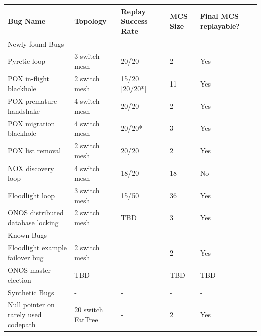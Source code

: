 \label{subsec:case_studies}

\begin{table}
\centering
\begin{tabular}{l|l|l|l|l|}
Bug Name & Topology & Replay Success Rate & MCS Size & Final MCS replayable? \\
\hline
Newly found Bugs & - & - & - & - \\
\hline
Pyretic loop & 3 switch mesh & 20/20 & 2 & Yes \\
POX in-flight blackhole & 2 switch mesh & 15/20 [20/20*] & 11 & Yes \\
POX premature handshake & 4 switch mesh & 20/20 & 2 & Yes \\
POX migration blackhole & 4 switch mesh & 20/20* & 3 & Yes \\
POX list removal & 2 switch mesh & 20/20 & 2 & Yes \\
NOX discovery loop & 4 switch mesh & 18/20 & 18 & No \\
Floodlight loop & 3 switch mesh & 15/50 & 36 & Yes \\
ONOS distributed database locking & 2 switch mesh & TBD & 3 & Yes \\
\hline
Known Bugs & - & - & - & - \\
\hline
Floodlight example failover bug & 2 switch mesh & - & 2 & Yes \\
ONOS master election & TBD & - & TBD & TBD \\
\hline
Synthetic Bugs & - & - & - & - \\
\hline
Null pointer on rarely used codepath & 20 switch FatTree & - & 2 & Yes \\

\end{tabular}
\end{table}
